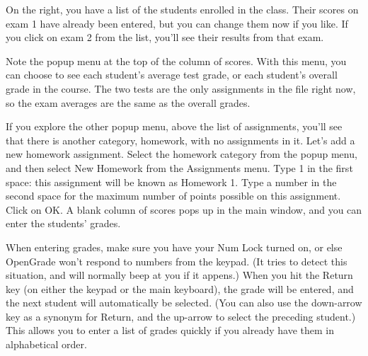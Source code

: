 \documentclass{opengrade_doc}
\begin{document}

On the right, you have a list of the students enrolled in the
class. Their scores on exam 1 have already been entered, but
you can change them now if you like. If you click on exam 2
from the list, you'll see their results from that exam.

Note the popup menu at the top of the column of scores.
With this menu, you can choose to see each student's average
test grade, or each student's overall grade in the course.
The two tests are the only assignments in the file right now,
so the exam averages are the same as the overall grades.

If you explore the other popup menu, above the list of assignments, you'll
see that there is another category, homework,
with no assignments in it. Let's add a new homework assignment.
Select the homework category from the popup menu, and then select
New Homework from the Assignments menu. Type 1 in the first space:
this assignment will be known as Homework 1. Type a number in the second
space for the maximum number of points possible on this assignment.
Click on OK. A blank column of scores pops up in the main window, and you can
enter the students' grades.

When entering grades, make sure you have your Num Lock turned on, or
else OpenGrade won't respond to numbers from the keypad. (It tries to
detect this situation, and will normally beep at you if it appens.)
When you hit
the Return key (on either the keypad or the main keyboard), the grade
will be entered, and the next student will automatically be selected.
(You can also use the down-arrow key as a synonym for Return, and the up-arrow
to select the preceding student.) This allows you to enter a list of
grades quickly if you already have them in alphabetical order.
\end{document}
